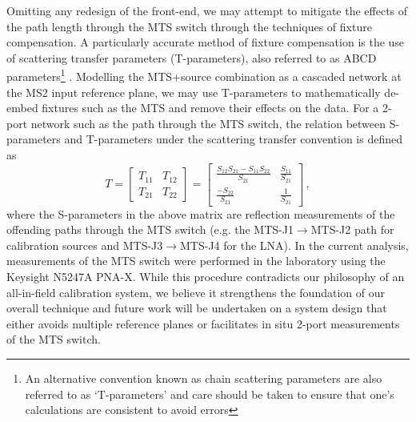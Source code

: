 Omitting any redesign of the front-end, we may attempt to mitigate the effects of the path length through the MTS switch through the techniques of fixture compensation. A particularly accurate method of fixture compensation is the use of scattering transfer parameters (T-parameters), also referred to as ABCD parameters\footnote{An alternative convention known as chain scattering parameters are also referred to as ‘T-parameters’ and care should be taken to ensure that one’s calculations are consistent to avoid errors} \citep{pozar}. Modelling the MTS+source combination as a cascaded network at the MS2 input reference plane, we may use T-parameters to mathematically de-embed fixtures such as the MTS and remove their effects on the data. For a 2-port network such as the path through the MTS switch, the relation between S-parameters and T-parameters under the scattering transfer convention is defined as
\begin{equation}
    T = \begin{bmatrix}
        T_{11} & T_{12} \\
        T_{21} & T_{22}
    \end{bmatrix}
    =
    \begin{bmatrix}
        \frac{S_{12}S_{21}-S_{11}S_{22}}{S_{21}} & \frac{S_{11}}{S_{21}} \\
        \frac{-S_{22}}{S_{21}} & \frac{1}{S_{21}}
    \end{bmatrix} \,,
    \label{eqn:tparams}
\end{equation}
where the S-parameters in the above matrix are reflection measurements of the offending paths through the MTS switch (e.g. the MTS-J1$\rightarrow$MTS-J2 path for calibration sources and MTS-J3$\rightarrow$MTS-J4 for the LNA). In the current analysis, measurements of the MTS switch were performed in the laboratory using the Keysight N5247A PNA-X. While this procedure contradicts our philosophy of an all-in-field calibration system, we believe it strengthens the foundation of our overall technique and future work will  be undertaken on a system design that either avoids multiple reference planes or facilitates in situ 2-port measurements of the MTS switch.

